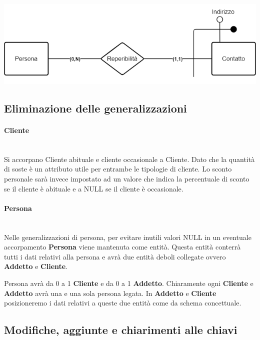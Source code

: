 \begin{center}
    \includegraphics[width=\linewidth / 2]{img/multi_valore.png}
\end{center}


\subsection{Eliminazione delle generalizzazioni}

\paragraph{Cliente}\mbox{}\\
Si accorpano Cliente abituale e cliente occasionale a Cliente. Dato che la quantità di soste è un attributo utile per entrambe le tipologie di cliente. Lo sconto personale sarà invece impostato ad un valore che indica la percentuale di sconto se il cliente è abituale e a NULL se il cliente è occasionale.

\paragraph{Persona}\mbox{}\\
Nelle generalizzazioni di persona, per evitare inutili valori NULL in un eventuale accorpamento \textbf{Persona} viene mantenuta come entità. Questa entità conterrà tutti i dati relativi alla persona e avrà due entità deboli collegate ovvero \textbf{Addetto} e \textbf{Cliente}.

Persona avrà da 0 a 1 \textbf{Cliente} e da 0 a 1 \textbf{Addetto}. Chiaramente ogni \textbf{Cliente}  e \textbf{Addetto} avrà una e una sola persona legata. In \textbf{Addetto} e \textbf{Cliente} posizioneremo i dati relativi a queste due entità come da schema concettuale.

\subsection{Modifiche, aggiunte e chiarimenti alle chiavi}


